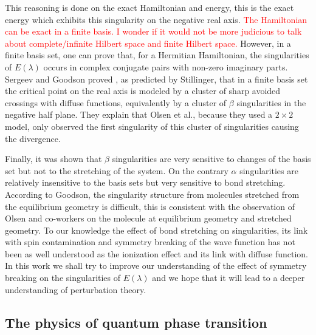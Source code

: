 \documentclass[11pt,a4paper]{article}
\newcommand{\titou}[1]{\textcolor{red}{#1}}
\begin{document}
This reasoning is done on the exact Hamiltonian and energy, this is the exact energy which exhibits this singularity on the negative real axis. 
\titou{The Hamiltonian can be exact in a finite basis. I wonder if it would not be more judicious to talk about complete/infinite Hilbert space and finite Hilbert space.}
However, in a finite basis set, one can prove that, for a Hermitian Hamiltonian, the singularities of $E(\lambda)$ occurs in complex conjugate pairs with non-zero imaginary parts. Sergeev and Goodson proved \cite{Sergeev_2005}, as predicted by Stillinger, \cite{} that in a finite basis set the critical point on the real axis is modeled by a cluster of sharp avoided crossings with diffuse functions, equivalently by a cluster of $\beta$ singularities in the negative half plane. They explain that Olsen et al., \cite{} because they used a $2\times2$ model, only observed the first singularity of this cluster of singularities causing the divergence.

Finally, it was shown that $\beta$ singularities are very sensitive to changes of the basis set but not to the stretching of the system. On the contrary $\alpha$ singularities are relatively insensitive to the basis sets but very sensitive to bond stretching. According to Goodson, \cite{Goodson_2004} the singularity structure from molecules stretched from the equilibrium geometry is difficult, this is consistent with the observation of Olsen and co-workers  \cite{Olsen_2000} on the  molecule at equilibrium geometry and stretched geometry. To our knowledge the effect of bond stretching on singularities, its link with spin contamination and symmetry breaking of the wave function has not been as well understood as the ionization effect and its link with diffuse function. In this work we shall try to improve our understanding of the effect of symmetry breaking on the singularities of $E(\lambda)$ and we hope that it will lead to a deeper understanding of perturbation theory.

\subsection{The physics of quantum phase transition}
\end{document}

